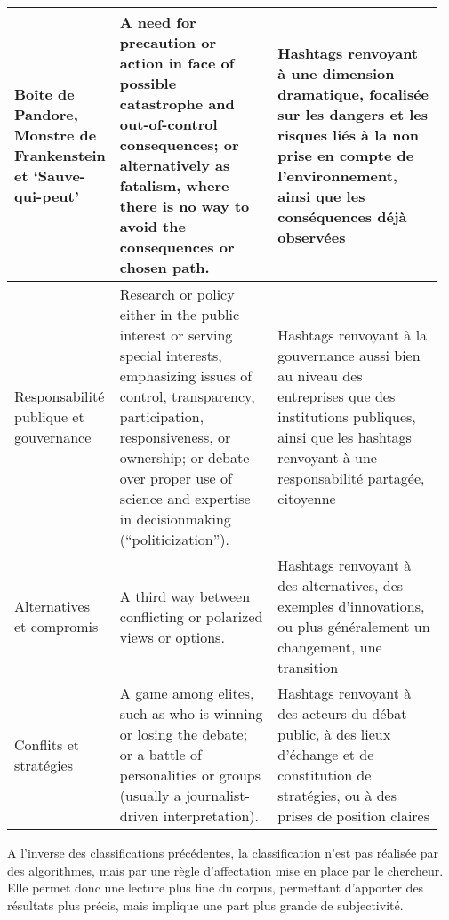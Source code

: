 \begin{landscape}
\begin{spacing}{1}
\begin{small}
\begin{longtable}{
            |K{0.18\linewidth}
            |K{0.38\linewidth}
            |K{0.40\linewidth}
            |}
            Boîte de Pandore, Monstre de Frankenstein et ‘Sauve-qui-peut’
            &A need for precaution or action in face of possible catastrophe and out-of-control consequences; or alternatively as fatalism, where there is no way to avoid the consequences or chosen path.
            &Hashtags renvoyant à une dimension dramatique, focalisée sur les dangers et les risques liés à la non prise en compte de l’environnement, ainsi que les conséquences déjà observées
            \\ \hline

            Responsabilité publique et gouvernance
            &Research or policy either in the public interest or serving special interests, emphasizing issues of control, transparency, participation, responsiveness, or ownership; or debate over proper use of science and expertise in decisionmaking (“politicization”).
            &Hashtags renvoyant à la gouvernance aussi bien au niveau des entreprises que des institutions publiques, ainsi que les hashtags renvoyant à une responsabilité partagée, citoyenne
            \\ \hline

            Alternatives et compromis
            &A third way between conflicting or polarized views or options.
            &Hashtags renvoyant à des alternatives, des exemples d’innovations, ou plus généralement un changement, une transition
            \\ \hline

            Conflits et stratégies
            &A game among elites, such as who is winning or losing the debate; or a battle of personalities or groups (usually a journalist-driven interpretation).
            &Hashtags renvoyant à des acteurs du débat public, à des lieux d’échange et de constitution de stratégies, ou à des prises de position claires
            \\ \hline


            \end{longtable}
            \end{small}
            \end{spacing}
        \end{landscape}

        A l'inverse des classifications précédentes, la classification n'est pas réalisée par des algorithmes, mais par une règle d'affectation mise en place par le chercheur. Elle permet donc une lecture plus fine du corpus, permettant d'apporter des résultats plus précis, mais implique une part plus grande de subjectivité.

